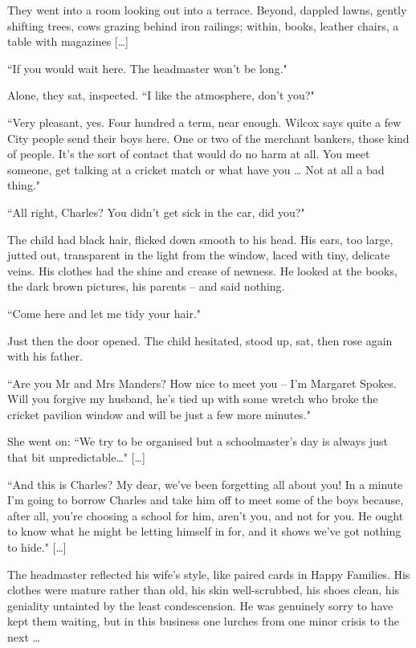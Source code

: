 \documentclass[10pt,a4paper]{article}
\newcommand{\qm}[1]{``#1"}
\begin{document}
They went into a room looking out into a terrace. Beyond, dappled lawns, gently shifting trees, cows grazing behind iron railings; within, books, leather chairs, a table with magazines [\ldots]

\qm{If you would wait here. The headmaster won't be long.}

Alone, they sat, inspected. \qm{I like the atmosphere, don't you?}

\qm{Very pleasant, yes. Four hundred a term, near enough. Wilcox says quite a few City people send their boys here. One or two of the merchant bankers, those kind of people. It's the sort of contact that would do no harm at all. You meet someone, get talking at a cricket match or what have you \ldots{} Not at all a bad thing.}

\qm{All right, Charles? You didn't get sick in the car, did you?}

The child had black hair, flicked down smooth to his head. His ears, too large, jutted out, transparent in the light from the window, laced with tiny, delicate veins. His clothes had the shine and crease of newness. He looked at the books, the dark brown pictures, his parents -- and said nothing.

\qm{Come here and let me tidy your hair.}

Just then the door opened. The child hesitated, stood up, sat, then rose again with his father.

\qm{Are you Mr and Mrs Manders? How nice to meet you -- I'm Margaret Spokes. Will you forgive my husband, he's tied up with some wretch who broke the cricket pavilion window and will be just a few more minutes.}

She went on: \qm{We try to be organised but a schoolmaster's day is always just that bit unpredictable\ldots{}} [\ldots]

\qm{And this is Charles? My dear, we've been forgetting all about you! In a minute I'm going to borrow Charles and take him off to meet some of the boys because, after all, you're choosing a school for him, aren't you, and not for you. He ought to know what he might be letting himself in for, and it shows we've got nothing to hide.} [\ldots]

The headmaster reflected his wife's style, like paired cards in Happy Families. His clothes were mature rather than old, his skin well-scrubbed, his shoes clean, his geniality untainted by the least condescension. He was genuinely sorry to have kept them waiting, but in this business one lurches from one minor crisis to the next \ldots{}
\end{document}
